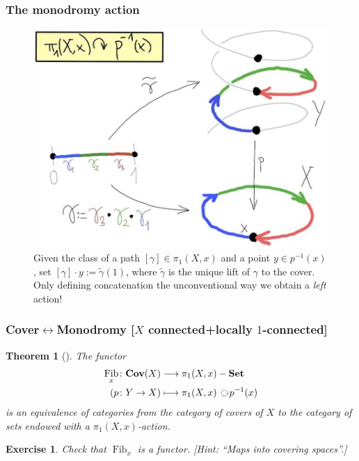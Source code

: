 \documentclass[notheorems, hyperref={backref}]{beamer}
\newtheorem*{thm}{Theorem}
\newtheorem{exe}{Exercise}
\DeclareMathOperator{\Fib}{Fib}
\newcommand{\Cov}{\mathbf{Cov}}
\newcommand{\act}{\mbox{ }\rotatebox[origin=c]{-120}{$\circlearrowright$}}
\begin{document}
\begin{frame}
    \frametitle{The monodromy action}
    \begin{figure}[htp]
	\centering
	\includegraphics[scale=.25]{pictures/monodromy.jpg}
	\caption{Given the class of a path $[\gamma]\in \pi_{1}(X,x)$ and a point $y\in p^{-1}(x)$, set $[\gamma]\cdot y:=\tilde{\gamma}(1)$, where $\tilde{\gamma}$ is the unique lift of $\gamma$ to the cover.
	Only defining concatenation the unconventional way we obtain a \textit{left} action!}
    \end{figure}
\end{frame}

\begin{frame}
    \frametitle{Cover$\leftrightarrow $Monodromy [$X$ connected+locally $1$-connected]}
    \begin{thm}[{\cite[Theorem 2.3.4]{sza08}}]
	The functor
	\begin{align*}
	    \Fib_{x}\colon \Cov(X) & \longrightarrow \pi_{1}(X,x)-\Set \\
	    (p\colon Y\to X) & \longmapsto \pi_{1}(X,x)\act p^{-1}(x)
	\end{align*}
	is an equivalence of categories from the category of covers of $X$ to the category of sets endowed with a $\pi_{1}(X,x)$-action.
    \end{thm}
    \pause

    \setcounter{exe}{1}
    \begin{exe}
	Check that $\Fib_{x}$ is a functor.
	[Hint: ``Maps into covering spaces''.]
    \end{exe}
\end{frame}
\end{document}
